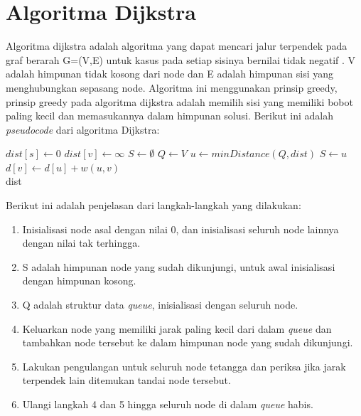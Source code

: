\section{Algoritma Dijkstra}
Algoritma dijkstra adalah algoritma yang dapat mencari jalur terpendek pada graf
berarah G=(V,E) untuk kasus pada setiap sisinya bernilai tidak
negatif \cite{Cormen:2001}. V adalah himpunan tidak kosong dari node dan E
adalah himpunan sisi yang menghubungkan sepasang node. Algoritma ini menggunakan
prinsip greedy, prinsip greedy pada algoritma dijkstra adalah memilih sisi yang
memiliki bobot paling kecil dan memasukannya dalam himpunan solusi. Berikut ini adalah
\textit{pseudocode} dari algoritma Dijkstra:
\begin{algorithm}{}\label{dijkstra}
\caption{$Dijkstra$}
\begin{algorithmic}
\State $dist[s] \leftarrow 0$
\State $dist[v] \leftarrow \infty$ 
\EndFor
\State $S \leftarrow \emptyset$
\State $Q \leftarrow V$
\State $u \leftarrow  minDistance(Q,dist)$
\State $S \leftarrow u$
\State $d[v] \leftarrow d[u] + w(u,  v)$
\EndIf
\EndFor
\EndWhile \\
\Return dist
\end{algorithmic}
\end{algorithm}

Berikut ini adalah penjelasan dari langkah-langkah yang dilakukan:
\begin{enumerate}
  \item Inisialisasi node asal dengan nilai 0, dan inisialisasi seluruh node
  lainnya dengan nilai tak terhingga.
  
  \item S adalah himpunan node yang sudah dikunjungi, untuk awal inisialisasi
  dengan himpunan kosong.
  
  \item Q adalah struktur data \textit{queue}, inisialisasi dengan seluruh node.
  
  \item Keluarkan node yang memiliki jarak paling kecil dari dalam
  \textit{queue} dan tambahkan node tersebut ke dalam himpunan node yang sudah dikunjungi.
  
  \item Lakukan pengulangan untuk seluruh node tetangga dan periksa jika jarak
  terpendek lain ditemukan tandai node tersebut.
  
  \item Ulangi langkah 4 dan 5 hingga seluruh node di dalam \textit{queue}
  habis.
\end{enumerate}

